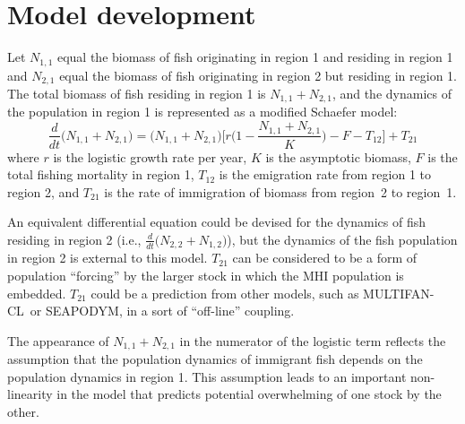 \documentclass[12pt,letterpaper,twoside]{article}
\newcommand\SD{SEAPODYM}
\newcommand\MFCL{MULTIFAN-CL}
\newcommand\None{{N_{1,1}}}
\newcommand\Ntwo{{N_{2,1}}}
\newcommand\Nsum{{N_{1,1}+N_{2,1}}}
\begin{document}
\section{Model development}
\label{sec:models}
Let $\None$ equal the biomass of fish originating in region 1
and residing in region 1
and $\Ntwo$ equal the biomass of fish originating in region 2
but residing in region 1.
The total biomass of fish residing in region 1 is
$\Nsum$, and the dynamics of the population in region 1 is represented
as a modified Schaefer model:
\begin{equation}
\frac{d}{dt}\big(\Nsum\big)=\big(\Nsum\big)\Big[r\Big(1-\frac{\Nsum}{K}\Big)-F-T_{12}\Big]+T_{21}
\label{eqn:logistic}
\end{equation}
where $r$ is the logistic growth rate per year, $K$ is the
asymptotic biomass,
$F$ is the total fishing mortality in region 1, $T_{12}$
is the emigration rate from region 1 to region 2, and $T_{21}$
is the rate of immigration of biomass from region~2 to region~1.


An equivalent differential equation could be devised for the dynamics of
fish residing in region 2 
(i.e., $\frac{d}{dt}\big(N_{2,2}+N_{1,2}\big)$), but 
the dynamics of the fish population in region 2 is external to this
model. $T_{21}$ can be considered to be a form of population ``forcing''
by the larger stock in which the MHI population is embedded. $T_{21}$
could be a prediction from other models, such as \MFCL\ or \SD, 
in a sort of ``off-line'' coupling.

The appearance of
$\Nsum$ in the numerator of the logistic term reflects the assumption
that the population dynamics of immigrant fish depends on
the population dynamics in region 1. This assumption leads to an
important non-linearity in the model that predicts potential
overwhelming of one stock by the other.
\end{document}
